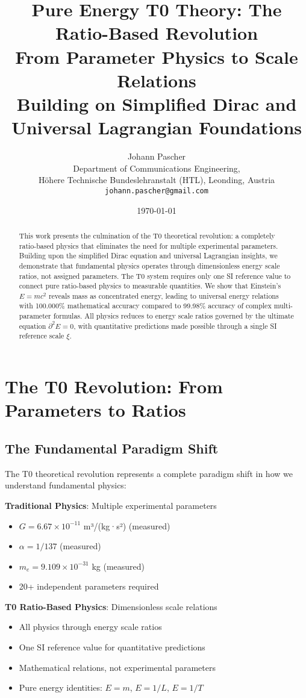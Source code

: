\documentclass[12pt,a4paper]{article}
\title{Pure Energy T0 Theory: The Ratio-Based Revolution \\
	From Parameter Physics to Scale Relations \\
	\large Building on Simplified Dirac and Universal Lagrangian Foundations}
\author{Johann Pascher\\
	Department of Communications Engineering, \\H\"ohere Technische Bundeslehranstalt (HTL), Leonding, Austria\\
	\texttt{johann.pascher@gmail.com}}
\date{\today}
\newcommand{\Efield}{E}
\newcommand{\xipar}{\xi}
\theoremstyle{definition}
\theoremstyle{remark}
\begin{document}
	
	\maketitle
	
	\begin{abstract}
		This work presents the culmination of the T0 theoretical revolution: a completely ratio-based physics that eliminates the need for multiple experimental parameters. Building upon the simplified Dirac equation and universal Lagrangian insights, we demonstrate that fundamental physics operates through dimensionless energy scale ratios, not assigned parameters. The T0 system requires only one SI reference value to connect pure ratio-based physics to measurable quantities. We show that Einstein's $E = mc^2$ reveals mass as concentrated energy, leading to universal energy relations with 100.000\% mathematical accuracy compared to 99.98\% accuracy of complex multi-parameter formulas. All physics reduces to energy scale ratios governed by the ultimate equation $\partial^2 \Efield = 0$, with quantitative predictions made possible through a single SI reference scale $\xipar$.
	\end{abstract}
	
	\tableofcontents
	\newpage
	
	\section{The T0 Revolution: From Parameters to Ratios}
	
	\subsection{The Fundamental Paradigm Shift}
	
	The T0 theoretical revolution represents a complete paradigm shift in how we understand fundamental physics:
	
	\begin{tcolorbox}[colback=red!5!white,colframe=red!75!black,title=Paradigm Revolution]
		\textbf{Traditional Physics}: Multiple experimental parameters
		\begin{itemize}
			\item $G = 6.67 \times 10^{-11}$ m³/(kg·s²) (measured)
			\item $\alpha = 1/137$ (measured)
			\item $m_e = 9.109 \times 10^{-31}$ kg (measured)
			\item 20+ independent parameters required
		\end{itemize}
		
		\textbf{T0 Ratio-Based Physics}: Dimensionless scale relations
		\begin{itemize}
			\item All physics through energy scale ratios
			\item One SI reference value for quantitative predictions
			\item Mathematical relations, not experimental parameters
			\item Pure energy identities: $E = m$, $E = 1/L$, $E = 1/T$
		\end{itemize}
	\end{tcolorbox}
	
\end{document}
